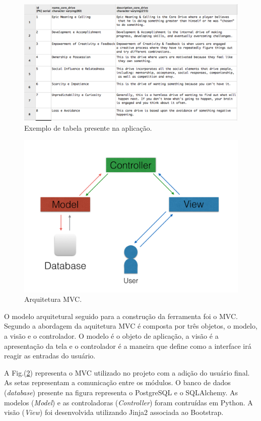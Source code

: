 \begin{figure}[h]
	\centering
		\includegraphics[keepaspectratio=true,scale=0.5]{figuras/mb.png}
	\caption{Exemplo de tabela presente na aplicação.\label{fig07}}
\end{figure}



\begin{figure}[h]
	\centering
		\includegraphics[keepaspectratio=true,scale=0.8]{figuras/MVC.png}
	\caption{Arquitetura MVC.\label{fig08}}
\end{figure}

O modelo arquitetural seguido para a construção da ferramenta foi o MVC. Segundo \cite{macoratti2009padroes} a abordagem da aquitetura MVC é composta por três objetos, o modelo, a visão e o controlador. O modelo é o objeto de aplicação, a visão é a apresentação da tela e o controlador é a maneira que define como a interface irá reagir as entradas do usuário.

 A  Fig.(\ref{fig08}) representa o MVC utilizado no projeto com a adição do usuário final. As setas representam a comunicação entre os módulos.\newpage
O banco de dados (\textit{database}) presente na figura representa o PostgreSQL e o SQLAlchemy. As modelos (\textit{Model}) e as controladoras (\textit{Controller}) foram contruídas em Python. A visão (\textit{View}) foi desenvolvida utilizando Jinja2 associada ao Bootstrap.

